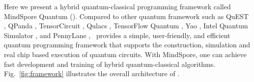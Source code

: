 Here we present a hybrid quantum-classical programming framework called MindSpore Quantum (\MindQuantum). Compared to other quantum framework such as QuEST \cite{jones2019quest}, QPanda \cite{dou2022qpanda}, TensorCircuit \cite{zhang2023tensorcircuit}, Qulacs \cite{suzuki2021qulacs}, TensorFlow Quantum \cite{broughton2020tensorflow}, Yao \cite{luo2020yao}, Intel Quantum Simulator \cite{guerreschi2020intel}, and PennyLane \cite{bergholm2018pennylane}, \MindQuantum\ provides a simple, user-friendly, and efficient quantum programming framework that supports the construction, simulation and real chip based execution of quantum circuits. With MindSpore, one can achieve fast development and training of hybrid quantum-classical algorithms. Fig.~\ref{fig:framework} illustrates the overall architecture of \MindQuantum.

\def \globalscale {1.000000}
